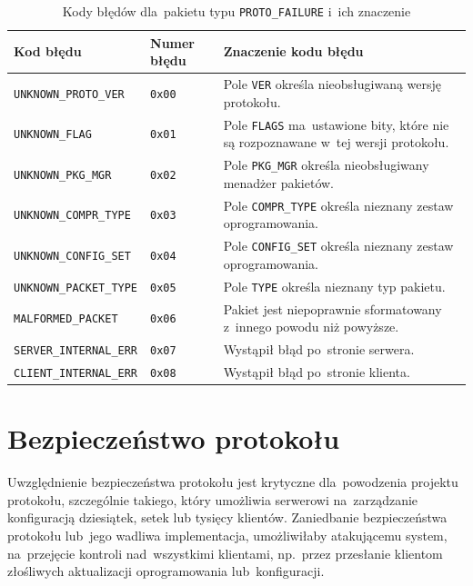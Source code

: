 \documentclass[thesis]{subfiles}
\begin{document}
\begin{table}
\centering
\renewcommand{\arraystretch}{1.3}
\begin{tabular}{l|p{1.5cm}|p{8.5cm}}
	Kod błędu                      & Numer błędu   & Znaczenie kodu błędu\\\hline\hline
	\texttt{UNKNOWN\_PROTO\_VER}   & \texttt{0x00} & Pole \texttt{VER} określa nieobsługiwaną wersję protokołu.\\\hline
	\texttt{UNKNOWN\_FLAG}         & \texttt{0x01} & Pole \texttt{FLAGS} ma~ustawione bity, które nie są rozpoznawane w~tej wersji protokołu.\\\hline
	\texttt{UNKNOWN\_PKG\_MGR}     & \texttt{0x02} & Pole \texttt{PKG\_MGR} określa nieobsługiwany menadżer pakietów.\\\hline
	\texttt{UNKNOWN\_COMPR\_TYPE}  & \texttt{0x03} & Pole \texttt{COMPR\_TYPE} określa nieznany zestaw oprogramowania.\\\hline
	\texttt{UNKNOWN\_CONFIG\_SET}  & \texttt{0x04} & Pole \texttt{CONFIG\_SET} określa nieznany zestaw oprogramowania.\\\hline
	\texttt{UNKNOWN\_PACKET\_TYPE} & \texttt{0x05} & Pole \texttt{TYPE} określa nieznany typ pakietu.\\\hline
	\texttt{MALFORMED\_PACKET}     & \texttt{0x06} & Pakiet jest niepoprawnie sformatowany z~innego powodu niż powyższe.\\\hline
	\texttt{SERVER\_INTERNAL\_ERR} & \texttt{0x07} & Wystąpił błąd po~stronie serwera.\\\hline
	\texttt{CLIENT\_INTERNAL\_ERR} & \texttt{0x08} & Wystąpił błąd po~stronie klienta.
\end{tabular}
\caption{Kody błędów dla~pakietu typu \texttt{PROTO\_FAILURE} i~ich znaczenie}
\label{fig:packet-protocol-failure-desc}
\end{table}


\section{Bezpieczeństwo protokołu}
\label{sec:security}

Uwzględnienie bezpieczeństwa protokołu jest krytyczne dla~powodzenia projektu protokołu, szczególnie takiego, który umożliwia serwerowi na~zarządzanie konfiguracją dziesiątek, setek lub tysięcy klientów. Zaniedbanie bezpieczeństwa protokołu lub~jego wadliwa implementacja, umożliwiłaby atakującemu system, na~przejęcie kontroli nad~wszystkimi klientami, np.~przez przesłanie klientom złośliwych aktualizacji oprogramowania lub~konfiguracji.
\end{document}
